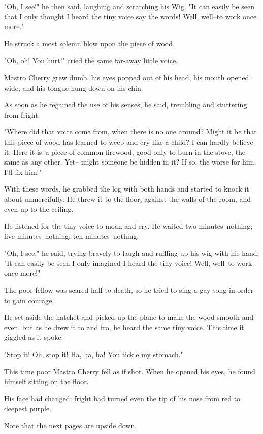 \documentclass[12pt,twoside]{article}
\begin{document}
{  "Oh, I see!" he then said, laughing and scratching his Wig.
  "It can easily be seen that I only thought I heard the tiny
  voice say the words! Well, well--to work once more."

  He struck a most solemn blow upon the piece of wood.

  "Oh, oh!  You hurt!" cried the same far-away little voice.

  Mastro Cherry grew dumb, his eyes popped out of his
  head, his mouth opened wide, and his tongue hung down
  on his chin.

  As soon as he regained the use of his senses, he said,
  trembling and stuttering from fright:

  "Where did that voice come from, when there is no
  one around?  Might it be that this piece of wood has
  learned to weep and cry like a child?  I can hardly
  believe it.  Here it is--a piece of common firewood, good
  only to burn in the stove, the same as any other.  Yet--
  might someone be hidden in it?  If so, the worse for him.
  I'll fix him!"

  With these words, he grabbed the log with both hands
  and started to knock it about unmercifully.  He threw it
  to the floor, against the walls of the room, and even up
  to the ceiling.

  He listened for the tiny voice to moan and cry.
  He waited two minutes--nothing; five minutes--nothing;
  ten minutes--nothing.

  "Oh, I see," he said, trying bravely to laugh and
  ruffling up his wig with his hand.  "It can easily be seen
  I only imagined I heard the tiny voice!  Well, well--to
  work once more!"

  The poor fellow was scared half to death, so he tried
  to sing a gay song in order to gain courage.

  He set aside the hatchet and picked up the plane to
  make the wood smooth and even, but as he drew it to
  and fro, he heard the same tiny voice.  This time it giggled
  as it spoke:

  "Stop it!  Oh, stop it!  Ha, ha, ha! You tickle my stomach."

  This time poor Mastro Cherry fell as if shot.  When
  he opened his eyes, he found himself sitting on the floor.

  His face had changed; fright had turned even the tip of
  his nose from red to deepest purple.

}
\bigskip
Note that the next pages are upside down.
\end{document}
